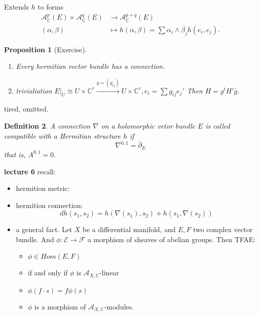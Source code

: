 \documentclass{article}
\newtheorem{definition}{Definition}[subsection]
\newtheorem{proposition}[definition]{Proposition}
\begin{document}
Extends $h$ to forms
  \begin{align*}
    \mathcal{A}_{\mathbb{C}}^{p}(E) \times  \mathcal{A}_{\mathbb{C}}^{q}(E)  &\longrightarrow  \mathcal{A}_{\mathbb{C}}^{p+q}(E)\\
    (\alpha,\beta)&\longmapsto h(\alpha,\beta)=\sum \alpha_{i}\wedge \bar{\beta_{j}}h(e_i,e_j).
  \end{align*}

\begin{proposition}[Exercise]
  \begin{enumerate}
    \item Every hermitian vector bundle has a connection.
    \item trivialiation  $E|_{U}\cong U \times  \mathbb{C}^{r} \xrightarrow{g=(g_{ij})} U \times \mathbb{C}^{r}, e_{i}=\sum g_{ij}e_{j}'$ Then $H=g^{t}H'\bar{g}$. 
  \end{enumerate}
\end{proposition}
tired, omitted.
\begin{definition}
  A connection $\nabla$ on a holomorphic vetor bundle $E$ is called compatible with a Hermitian structure $h$ if
  \[
    \nabla^{0,1}= \bar{\partial}_{E}
  \]
 that is, $A^{0,1}=0$.
\end{definition}

 \textbf{lecture 6}
recall:
\begin{itemize}
  \item hermition metric:
  \item hermition connection:
    \[
      dh(s_{1},s_{2})=h(\nabla(s_{1}),s_{2})+h(s_{1},\nabla(s_{2}))
    \]
  \item a general fact. Let $X$ be a differential manifold, and $E,F$ two complex vector bundle. And $\phi: \mathcal{E}\to \mathcal{F}$ a morphism of sheaves of abelian groups. Then TFAE:
    \begin{itemize}
      \item $\phi \in Hom(E,F)$ 
      \item if and only if $\phi $ is $\mathcal{A}_{X,\mathbb{C}}$-linear 
      \item $ \phi(f\cdot s)=f\phi(s) $
      \item $\phi$ is a morphism of $\mathcal{A}_{X,\mathbb{C}}$-modules. 
    \end{itemize}
\end{itemize}
\end{document}
